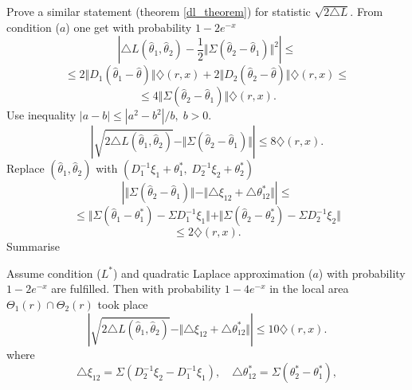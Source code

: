 Prove a similar statement (theorem \ref{dl_theorem}) for statistic $\sqrt{2 \triangle L}$. From condition ($a$) one get with probability $1 - 2e^{-x}$
\[
\left| \triangle L (\widehat{\theta}_1, \widehat{\theta}_2) - \frac{1}{2} \Vert \Sigma (\widehat{\theta}_2 -\widehat{\theta}_1) \Vert^2 \right| \leq 
\]
\[
\leq
2 \Vert D_1(\widehat{\theta}_1 - \widehat{\theta}) \Vert \diamondsuit (r, x) + 2 \Vert D_2(\widehat{\theta}_2 - \widehat{\theta}) \Vert \diamondsuit (r, x) 
\leq 
\] 
\[
\leq  4  \Vert  \Sigma(\widehat{\theta}_2 - \widehat{\theta}_1)  \Vert  \diamondsuit (r, x).
\]
Use inequality $|a - b| \leq |a^2 - b^2| / b, \; b >0$.
\[
\left| \sqrt{ 2\triangle L (\widehat{\theta}_1, \widehat{\theta}_2) } -  \Vert \Sigma (\widehat{\theta}_2 -\widehat{\theta}_1) \Vert \right| \leq 
8   \diamondsuit (r, x).
\]
Replace $(\widehat{\theta}_1, \widehat{\theta}_2)$ with $(D_1^{-1}\xi_1 + \theta_1^*, \; D_2^{-1}\xi_2 + \theta_2^*)$
\[
\left| \Vert \Sigma (\widehat{\theta}_2 -\widehat{\theta}_1) \Vert  - 
\Vert \triangle \xi_{12} + \triangle \theta_{12}^* \Vert 
\right | \leq
\]
\[
\leq  \Vert \Sigma(\widehat{\theta}_1 - \theta_1^*) - \Sigma D_1^{-1} \xi_1 \Vert
+ \Vert \Sigma(\widehat{\theta}_2 - \theta_2^*) - \Sigma D_2^{-1} \xi_2 \Vert
\]
\[
\leq  2 \diamondsuit (r, x).
\]
Summarise   
\begin{theorem}
\label{dl_sq_theorem}

Assume condition ($L^*$) and quadratic Laplace approximation ($a$) with probability $1 - 2 e^{-x}$ are fulfilled. Then  with probability $1 - 4 e^{-x}$ in the local area  $\Theta_1(r) \cap \Theta_2(r)$ took place
\[
\left| 
\sqrt{ 2\triangle L (\widehat{\theta}_1, \widehat{\theta}_2) } - 
\Vert \triangle \xi_{12} + \triangle \theta_{12}^* \Vert 
\right| \leq 
10  \diamondsuit (r, x).
\]
where
\[
\triangle \xi_{12}  = \Sigma (D_2^{-1} \xi_2 - D_1^{-1} \xi_1),
\quad
\triangle \theta_{12}^*  = \Sigma (\theta_2^* - \theta_1^*), 
\]

\end{theorem}

